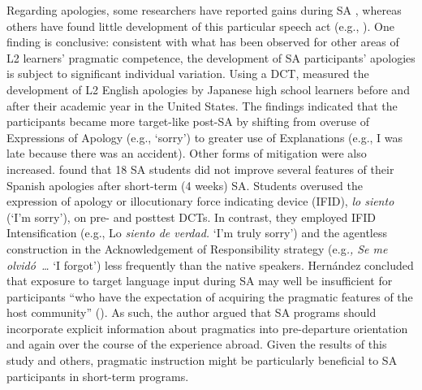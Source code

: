 \documentclass[output=paper]{langscibook}
\begin{document}
  Regarding apologies, some researchers have reported gains during SA \citep{WargaScholmberger2007}, whereas others have found little development of this particular speech act (e.g., \citealt{Hernández2018a,Kondo1997,ShivelyCohen2008}). One finding is conclusive: consistent with what has been observed for other areas of L2 learners’ pragmatic competence, the development of SA participants’ apologies is subject to significant individual variation. Using a DCT, \citet{Kondo1997} measured the development of L2 English apologies by Japanese high school learners before and after their academic year in the United States. The findings indicated that the participants became more target-like post-SA by shifting from overuse of Expressions of Apology (e.g., `sorry') to greater use of Explanations (e.g., I was late because there was an accident). Other forms of mitigation were also increased. \citet{Hernández2018a} found that 18 SA students did not improve several features of their Spanish apologies after short-term (4 weeks) SA. Students overused the expression of apology or illocutionary force indicating device (IFID), \textit{lo siento} (`I’m sorry'), on pre- and posttest DCTs. In contrast, they employed IFID Intensification (e.g., Lo \textit{siento de verdad.} `I’m truly sorry’) and the agentless construction in the Acknowledgement of Responsibility strategy (e.g\textit{., Se me olvidó~\ldots} `I forgot’) less frequently than the native speakers. Hernández concluded that exposure to target language input during SA may well be insufficient for participants “who have the expectation of acquiring the pragmatic features of the host community” (\citeyear[616]{Hernández2018a}). As such, the author argued that SA programs should incorporate explicit information about pragmatics into pre-departure orientation and again over the course of the experience abroad. Given the results of this study and others, pragmatic instruction might be particularly beneficial to SA participants in short-term programs.
\end{document}
